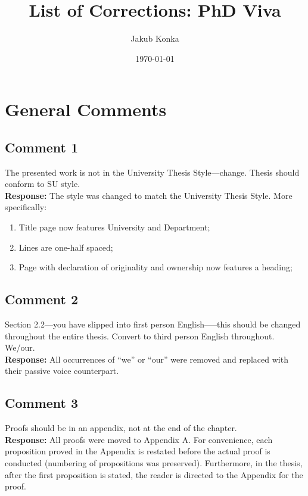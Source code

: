 \documentclass[10pt,a4paper,notitlepage]{article}
\numberwithin{equation}{section}
\begin{document}
\title{List of Corrections: PhD Viva}
\date{\today}
\author{Jakub Konka}

\maketitle

\setcounter{section}{0}
\renewcommand{\thesection}{G}
\renewcommand{\thesubsection}{G\arabic{subsection}}
\section{General Comments}

\setcounter{subsection}{0}
\subsection{Comment 1}
The presented work is not in the University Thesis Style---change. Thesis should conform to SU style.\\[-2ex]

\textbf{Response:}
The style was changed to match the University Thesis Style. More specifically:
\begin{enumerate}
	\item Title page now features University and Department;
	\item Lines are one-half spaced;
	\item Page with declaration of originality and ownership now features a heading;
\end{enumerate}

\subsection{Comment 2}
Section 2.2---you have slipped into first person English–––this should be changed throughout the entire thesis. Convert to third person English throughout. We/our.\\[-2ex]

\textbf{Response:}
All occurrences of ``we'' or ``our'' were removed and replaced with their passive voice counterpart.

\subsection{Comment 3}
Proofs should be in an appendix, not at the end of the chapter.\\[-2ex]

\textbf{Response:}
All proofs were moved to Appendix A. For convenience, each proposition proved in the Appendix is restated before the actual proof is conducted (numbering of propositions was preserved). Furthermore, in the thesis, after the first proposition is stated, the reader is directed to the Appendix for the proof.
\end{document}
